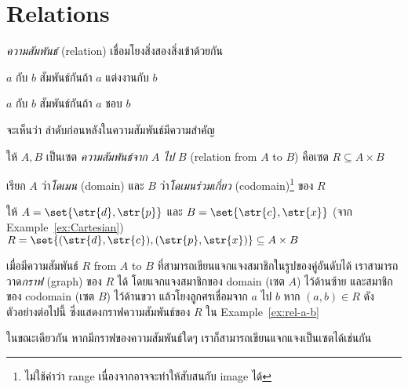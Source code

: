 \section{Relations}

\emph{ความสัมพันธ์} (relation) เชื่อมโยงสิ่งสองสิ่งเข้าด้วยกัน
%
\begin{example}
$a$ กับ $b$ สัมพันธ์กันถ้า $a$ แต่งงานกับ $b$
\end{example}
\begin{example}
$a$ กับ $b$ สัมพันธ์กันถ้า $a$ ชอบ $b$
\end{example}
%
จะเห็นว่า ลำดับก่อนหลังในความสัมพันธ์มีความสำคัญ

\begin{definition}
ให้ $A,B$ เป็นเซต \enskip \emph{ความสัมพันธ์จาก $A$ ไป $B$} (relation from $A$ to $B$) คือเซต $R\subseteq A\times B$

เรียก $A$ ว่า\emph{โดเมน} (domain) และ $B$ ว่า\emph{โดเมนร่วมเกี่ยว} (codomain)\footnote{ไม่ใช้คำว่า range เนื่องจากอาจจะทำให้สับสนกับ image ได้} ของ $R$
\end{definition}
%
\begin{example}\label{ex:rel-a-b}
ให้ $A=\set{\str{d},\str{p}}$ และ $B=\set{\str{c},\str{x}}$ (จาก Example~\ref{ex:Cartesian}) \enskip $R=\set{(\str{d},\str{c}),(\str{p},\str{x})}\subseteq A\times B$ 
\end{example}
เมื่อมีความสัมพันธ์ $R$ from $A$ to $B$ ที่สามารถเขียนแจกแจงสมาชิกในรูปของคู่อันดับได้ เราสามารถวาด\emph{กราฟ} (graph) ของ $R$ ได้ โดยแจกแจงสมาชิกของ domain (เซต $A$) ไว้ด้านซ้าย และสมาชิกของ codomain (เซต $B$) ไว้ด้านขวา แล้วโยงลูกศรเชื่อมจาก $a$ ไป $b$ หาก $(a,b)\in R$ ดังตัวอย่างต่อไปนี้ ซึ่งแสดงกราฟความสัมพันธ์ของ $R$ ใน Example~\ref{ex:rel-a-b}
\begin{center}
\end{center}
ในขณะเดียวกัน หากมีกราฟของความสัมพันธ์ใดๆ เราก็สามารถเขียนแจกแจงเป็นเซตได้เช่นกัน
%
